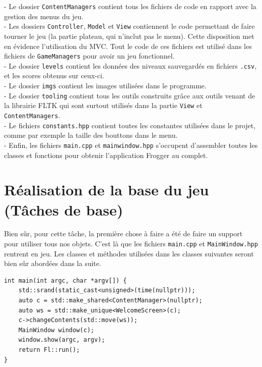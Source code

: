 \documentclass[a4paper, 12pt]{article}
\begin{document}
- Le dossier \texttt{ContentManagers} contient tous les fichiers de code en rapport 
avec la gestion des menus du jeu. \\
- Les dossiers \texttt{Controller}, \texttt{Model} et \texttt{View} 
contiennent le code permettant de faire tourner le jeu 
(la partie plateau, qui n'inclut pas le menu).
Cette disposition met en évidence l'utilisation du MVC. 
Tout le code de ces fichiers est utilisé dans les fichiers de \texttt{GameManagers} 
pour avoir un jeu fonctionnel. \\
- Le dossier \texttt{levels} contient les données des niveaux sauvegardés en fichiers 
\texttt{.csv}, et les scores obtenus sur ceux-ci. \\
- Le dossier  \texttt{imgs} contient les images utilisées dans le programme. \\
- Le dossier \texttt{tooling} contient tous les outils construits grâce aux outils 
venant de la librairie FLTK qui sont surtout utilisés dans la partie 
\texttt{View} et \texttt{ContentManagers}. \\
- Le fichiers \texttt{constants.hpp} contient toutes les constantes utilisées dans le projet,
comme par exemple la taille des bouttons dans le menu. \\
- Enfin, les fichiers \texttt{main.cpp} et \texttt{mainwindow.hpp} s'occupent 
d'assembler toutes les classes et fonctions pour obtenir l'application Frogger 
au complet. 

\section{Réalisation de la base du jeu (Tâches de base)}
Bien sûr, pour cette tâche, 
la première chose à faire a été de faire un support pour utiliser tous nos objets.
C'est là que les fichiers \texttt{main.cpp} et \texttt{MainWindow.hpp} rentrent en jeu. 
Les classes et méthodes utilisées dans les classes suivantes seront bien sûr 
abordées dans la suite. 

\begin{lstlisting}
int main(int argc, char *argv[]) {
    std::srand(static_cast<unsigned>(time(nullptr)));
    auto c = std::make_shared<ContentManager>(nullptr);
    auto ws = std::make_unique<WelcomeScreen>(c);
    c->changeContents(std::move(ws));
    MainWindow window(c);
    window.show(argc, argv);
    return Fl::run();
}
\end{lstlisting}

\pagebreak
\end{document}
